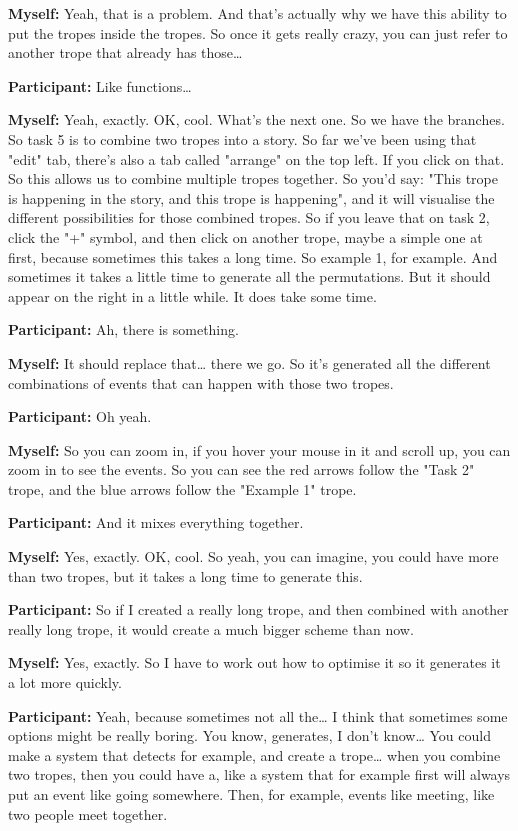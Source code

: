 \documentclass[11pt]{report}
\begin{document}
\begin{linenumbers}
\textbf{Myself:} Yeah, that is a problem. And that's actually why we have this ability to put the tropes inside the tropes. So once it gets really crazy, you can just refer to another trope that already has those\ldots{}

\textbf{Participant:} Like functions\ldots{}

\textbf{Myself:} Yeah, exactly. OK, cool. What's the next one. So we have the branches. So task 5 is to combine two tropes into a story. So far we've been using that "edit" tab, there's also a tab called "arrange" on the top left. If you click on that. So this allows us to combine multiple tropes together. So you'd say: "This trope is happening in the story, and this trope is happening", and it will visualise the different possibilities for those combined tropes. So if you leave that on task 2, click the "+" symbol, and then click on another trope, maybe a simple one at first, because sometimes this takes a long time. So example 1, for example. And sometimes it takes a little time to generate all the permutations. But it should appear on the right in a little while. It does take some time.

\textbf{Participant:} Ah, there is something.

\textbf{Myself:} It should replace that\ldots{} there we go. So it's generated all the different combinations of events that can happen with those two tropes.

\textbf{Participant:} Oh yeah.

\textbf{Myself:} So you can zoom in, if you hover your mouse in it and scroll up, you can zoom in to see the events. So you can see the red arrows follow the "Task 2" trope, and the blue arrows follow the "Example 1" trope.

\textbf{Participant:} And it mixes everything together.

\textbf{Myself:} Yes, exactly. OK, cool. So yeah, you can imagine, you could have more than two tropes, but it takes a long time to generate this.

\textbf{Participant:} So if I created a really long trope, and then combined with another really long trope, it would create a much bigger scheme than now.

\textbf{Myself:} Yes, exactly. So I have to work out how to optimise it so it generates it a lot more quickly.

\textbf{Participant:} Yeah, because sometimes not all the\ldots{} I think that sometimes some options might be really boring. You know, generates, I don't know\ldots{} You could make a system that detects for example, and create a trope\ldots{} when you combine two tropes, then you could have a, like a system that for example first will always put an event like going somewhere. Then, for example, events like meeting, like two people meet together.


\end{linenumbers}
\end{document}
